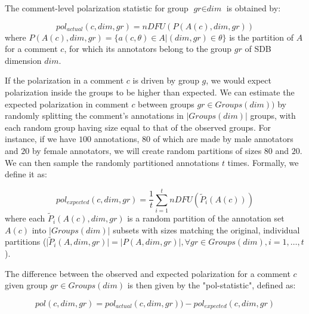 \documentclass{article}
\newcommand{\sdbdim}{\textit{dim}}
\newcommand{\sdbgroup}{\textit{gr}}
\newcommand{\Sdbgroup}{\textit{Groups}}
\begin{document}
 The comment-level polarization statistic for group $\sdbgroup \in \sdbdim$ is obtained by:
 
 \begin{equation}
 	pol_{actual}(c, \sdbdim, \sdbgroup) = nDFU(P(A(c), \sdbdim, \sdbgroup))
 \end{equation}
 \noindent where $P(A(c),\sdbdim, \sdbgroup) = \{a(c, \theta) \in A | (\sdbdim, \sdbgroup) \in \theta\}$ is the partition of $A$ for a comment $c$, for which its annotators belong  to the group $\sdbgroup$ of \ac{SDB} dimension $\sdbdim$.
 
 If the polarization in a comment $c$ is driven by group $g$, we would expect polarization inside the groups to be higher than expected. We can estimate the expected polarization in comment $c$ between groups $\sdbgroup \in \Sdbgroup(\sdbdim))$ by randomly splitting the comment's annotations in $\lvert \Sdbgroup(\sdbdim) \rvert$ groups, with each random group having size equal to that of the observed groups. For instance, if we have $100$ annotations, $80$ of which are made by male annotators and $20$ by female annotators, we will create random partitions of sizes $80$ and $20$. We can then sample the randomly partitioned annotations $t$ times. Formally, we define it as:
 
 \begin{equation}
 	\label{eq:pol_expected}
 	pol_{expected}(c, \sdbdim, \sdbgroup) = \frac{1}{t} \sum_{i=1}^t  nDFU(\tilde{P}_i(A(c)))
 \end{equation}
 \noindent where each $\tilde{P}_i(A(c), \sdbdim, \sdbgroup)$ is a random partition of the annotation set $A(c)$ into $\lvert \Sdbgroup(\sdbdim) \rvert$ subsets with sizes matching the original, individual partitions ($\lvert \tilde{P}_i(A, \sdbdim, \sdbgroup) \rvert = \lvert P(A, \sdbdim, \sdbgroup) \rvert, \forall \sdbgroup \in \Sdbgroup(\sdbdim) , i=1, \ldots, t$).
 
 The difference between the observed and expected polarization for a comment $c$ given group $\sdbgroup \in \Sdbgroup(\sdbdim)$ is then given by the "pol-statistic", defined as: 
 
 \begin{equation}
	\textit{pol}(c, \sdbdim, \sdbgroup)  = pol_{actual}(c, \sdbdim, \sdbgroup)) - pol_{expected}(c, \sdbdim, \sdbgroup)
\end{equation}
\end{document}
